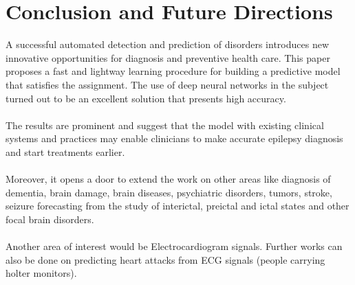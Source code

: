 \documentclass{llncs}       %
\begin{document}
\paragraph{}\paragraph{}
\paragraph{}\paragraph{}
\paragraph{}\paragraph{}


\section{Conclusion and Future Directions}
\label{sec:4}



 A successful automated detection and prediction of disorders introduces new innovative opportunities for diagnosis and preventive health care. This paper proposes a fast and lightway learning procedure for building a predictive model that satisfies the assignment. The use of deep neural networks in the subject turned out to be an excellent solution that presents high accuracy.  
\paragraph{}
The results are prominent and suggest that the model with existing clinical systems and practices may enable clinicians to make accurate epilepsy diagnosis and start  treatments earlier.
\paragraph{}
Moreover, it opens a door to extend the work on other areas like diagnosis of dementia, brain damage, brain diseases, psychiatric disorders, tumors, stroke, seizure forecasting from the study of interictal, preictal and ictal states and other focal brain disorders. 
\paragraph{}
Another area of interest would be Electrocardiogram signals. Further works can also be done on predicting heart attacks from ECG signals (people carrying holter monitors). 
\end{document}
